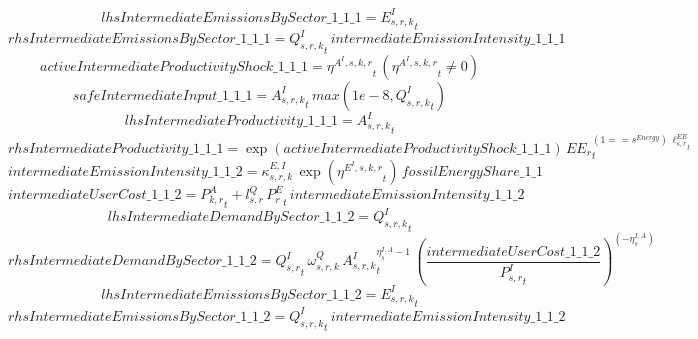 \begin{dmath*}
lhsIntermediateEmissionsBySector\_1\_1\_1 = {{E^I_{s,r,k}}}_{t}
\end{dmath*}
\begin{dmath*}
rhsIntermediateEmissionsBySector\_1\_1\_1 = {{Q^{I}_{s,r,k}}}_{t}\, {intermediateEmissionIntensity\_1\_1\_1}
\end{dmath*}
\begin{dmath*}
activeIntermediateProductivityShock\_1\_1\_1 = {{\eta^{A^{I},s,k,r}}}_{t}\, \left({{\eta^{A^{I},s,k,r}}}_{t}\neq 0\right)
\end{dmath*}
\begin{dmath*}
safeIntermediateInput\_1\_1\_1 = {{A^{I}_{s,r,k}}}_{t}\, max(1e-8,{{Q^{I}_{s,r,k}}}_{t})
\end{dmath*}
\begin{dmath*}
lhsIntermediateProductivity\_1\_1\_1 = {{A^{I}_{s,r,k}}}_{t}
\end{dmath*}
\begin{dmath*}
rhsIntermediateProductivity\_1\_1\_1 = \exp\left({activeIntermediateProductivityShock\_1\_1\_1}\right)\, {{EE_r}}_{t}^{\left(1=={{s^{Energy}}}\right)\, {{\ell^{EE}_{s,r}}}_{t}}
\end{dmath*}
\begin{dmath*}
intermediateEmissionIntensity\_1\_1\_2 = {{\kappa^{E,I}_{s,r,k}}}\, \exp\left({{\eta^{E^{I},s,k,r}}}_{t}\right)\, {fossilEnergyShare\_1\_1}
\end{dmath*}
\begin{dmath*}
intermediateUserCost\_1\_1\_2 = {{P^{A}_{k,r}}}_{t}+{{l^{Q}_{s,r}}}\, {{P^E_r}}_{t}\, {intermediateEmissionIntensity\_1\_1\_2}
\end{dmath*}
\begin{dmath*}
lhsIntermediateDemandBySector\_1\_1\_2 = {{Q^{I}_{s,r,k}}}_{t}
\end{dmath*}
\begin{dmath*}
rhsIntermediateDemandBySector\_1\_1\_2 = {{Q^{I}_{s,r}}}_{t}\, {{\omega^{Q}_{s,r,k}}}\, {{A^{I}_{s,r,k}}}_{t}^{{{\eta^{I,A}_{s}}}-1}\, \left(\frac{{intermediateUserCost\_1\_1\_2}}{{{P^{I}_{s,r}}}_{t}}\right)^{\left(-{{\eta^{I,A}_{s}}}\right)}
\end{dmath*}
\begin{dmath*}
lhsIntermediateEmissionsBySector\_1\_1\_2 = {{E^I_{s,r,k}}}_{t}
\end{dmath*}
\begin{dmath*}
rhsIntermediateEmissionsBySector\_1\_1\_2 = {{Q^{I}_{s,r,k}}}_{t}\, {intermediateEmissionIntensity\_1\_1\_2}
\end{dmath*}

